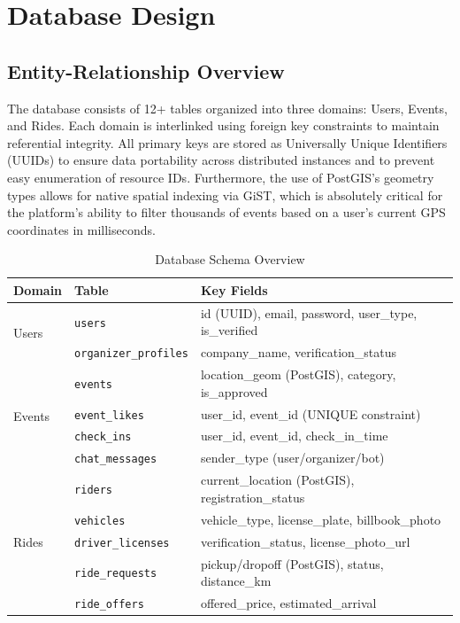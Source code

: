 \section{Database Design}

\subsection{Entity-Relationship Overview}
The database consists of 12+ tables organized into three domains: Users, Events, and Rides. Each domain is interlinked using foreign key constraints to maintain referential integrity. All primary keys are stored as Universally Unique Identifiers (UUIDs) to ensure data portability across distributed instances and to prevent easy enumeration of resource IDs. Furthermore, the use of PostGIS's geometry types allows for native spatial indexing via GiST, which is absolutely critical for the platform's ability to filter thousands of events based on a user's current GPS coordinates in milliseconds.

\begin{table}[H]
\centering
\caption{Database Schema Overview}
\label{tab:db_schema}
\begin{tabular}{@{}llp{6.5cm}@{}}
\toprule
\textbf{Domain} & \textbf{Table} & \textbf{Key Fields} \\
\midrule
\multirow{2}{*}{Users} & \texttt{users} & id (UUID), email, password, user\_type, is\_verified \\
                        & \texttt{organizer\_profiles} & company\_name, verification\_status \\
\midrule
\multirow{4}{*}{Events} & \texttt{events} & location\_geom (PostGIS), category, is\_approved \\
                         & \texttt{event\_likes} & user\_id, event\_id (UNIQUE constraint) \\
                         & \texttt{check\_ins} & user\_id, event\_id, check\_in\_time \\
                         & \texttt{chat\_messages} & sender\_type (user/organizer/bot) \\
\midrule
\multirow{5}{*}{Rides} & \texttt{riders} & current\_location (PostGIS), registration\_status \\
                        & \texttt{vehicles} & vehicle\_type, license\_plate, billbook\_photo \\
                        & \texttt{driver\_licenses} & verification\_status, license\_photo\_url \\
                        & \texttt{ride\_requests} & pickup/dropoff (PostGIS), status, distance\_km \\
                        & \texttt{ride\_offers} & offered\_price, estimated\_arrival \\
\bottomrule
\end{tabular}
\end{table}

